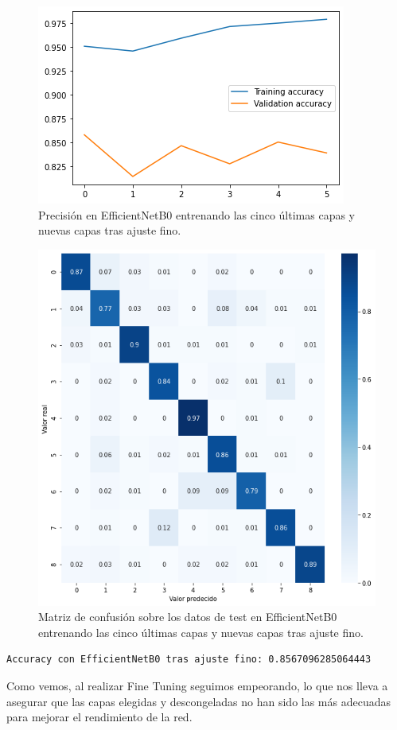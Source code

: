 \begin{figure}[H]
  \centering
  \includegraphics[width=0.5\linewidth]{Imagenes/entrenamiento_redes/5-ult/efficientnet_5fine_acc.png}
  \caption{Precisión en EfficientNetB0 entrenando las cinco últimas capas y nuevas capas tras ajuste fino.}
\end{figure}

\begin{figure}[H]
  \centering
  \includegraphics[width=0.5\linewidth]{Imagenes/entrenamiento_redes/5-ult/efficientnet_5fine_matriz.png}
  \caption{Matriz de confusión sobre los datos de test en EfficientNetB0 entrenando las cinco últimas capas y nuevas capas tras ajuste fino.}
\end{figure}


\begin{lstlisting}
Accuracy con EfficientNetB0 tras ajuste fino: 0.8567096285064443
\end{lstlisting}


Como vemos, al realizar Fine Tuning seguimos empeorando, lo que nos lleva a asegurar que las capas elegidas y descongeladas no han sido las más adecuadas para mejorar el rendimiento de la red.
